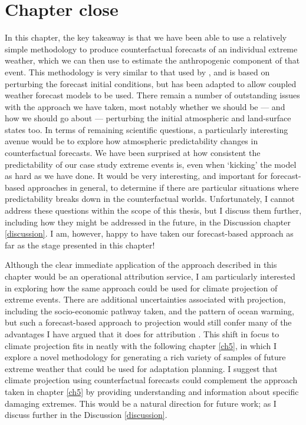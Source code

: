 \section{Chapter close}

  In this chapter, the key takeaway is that we have been able to use a relatively simple methodology to produce counterfactual forecasts of an individual extreme weather, which we can then use to estimate the anthropogenic component of that event. This methodology is very similar to that used by \citet{pall_anthropogenic_2011}, and is based on perturbing the forecast initial conditions, but has been adapted to allow coupled weather forecast models to be used. There remain a number of outstanding issues with the approach we have taken, most notably whether we should be --- and how we should go about --- perturbing the initial atmospheric and land-surface states too. In terms of remaining scientific questions, a particularly interesting avenue would be to explore how atmospheric predictability changes in counterfactual forecasts. We have been surprised at how consistent the predictability of our case study extreme events is, even when `kicking' the model as hard as we have done. It would be very interesting, and important for forecast-based approaches in general, to determine if there are particular situations where predictability breaks down in the counterfactual worlds. Unfortunately, I cannot address these questions within the scope of this thesis, but I discuss them further, including how they might be addressed in the future, in the Discussion chapter \ref{discussion}. I am, however, happy to have taken our forecast-based approach as far as the stage presented in this chapter!

  Although the clear immediate application of the approach described in this chapter would be an operational attribution service, I am particularly interested in exploring how the same approach could be used for climate projection of extreme events. There are additional uncertainties associated with projection, including the socio-economic pathway taken, and the pattern of ocean warming, but such a forecast-based approach to projection would still confer many of the advantages I have argued that it does for attribution \citep[e.g.][]{hazeleger_tales_2015}. This shift in focus to climate projection fits in neatly with the following chapter \ref{ch5}, in which I explore a novel methodology for generating a rich variety of samples of future extreme weather that could be used for adaptation planning. I suggest that climate projection using counterfactual forecasts could complement the approach taken in chapter \ref{ch5} by providing understanding and information about specific damaging extremes. This would be a natural direction for future work; as I discuss further in the Discussion \ref{discussion}.